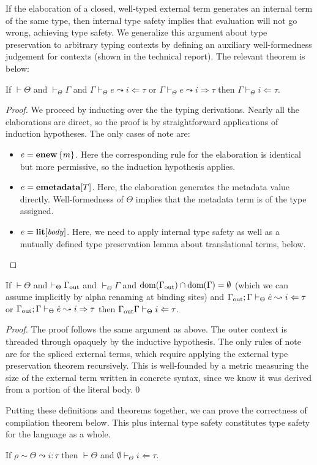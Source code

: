 If the elaboration of a closed, well-typed external term generates an internal term of the same type, then internal type safety implies that evaluation will not go wrong, achieving type safety. We generalize this argument about type preservation to arbitrary typing contexts by defining an auxiliary well-formedness judgement for contexts (shown in the technical report). The relevant theorem is below:

\begin{theorem}
If $\vdash \Theta$ and $\vdash_\Theta \Gamma$ and $\Gamma \vdash_\Theta e \leadsto i \Leftarrow \tau$ or $\Gamma \vdash_\Theta e \leadsto i \Rightarrow \tau$ then $\Gamma \vdash_\Theta i \Leftarrow \tau$.
\end{theorem}
\begin{proof}
We proceed by inducting over the the typing derivations. Nearly all the elaborations are direct, so the proof is by straightforward applications of induction hypotheses. The only cases of note are:
\begin{itemize}
\item $e = \textbf{enew}\,\{m\}$. Here the corresponding rule for the elaboration is identical but more permissive, so the induction hypothesis applies.
\item $e = \textbf{emetadata}[T]$. Here, the elaboration generates the metadata value directly. Well-formedness of $\Theta$ implies that the metadata term is of the type assigned.
\item $e = \textbf{lit}[\mathit{body}]$. Here, we need to apply internal type safety as well as a mutually defined type preservation lemma about translational terms, below.
\end{itemize}
\end{proof}

\begin{lemma}
If $\vdash \Theta$ and $\vdash_\Theta \Gamma_{\text{out}}$ and $\vdash_\Theta \Gamma$ and $\text{dom}(\Gamma_{\text{out}}) \cap \text{dom}(\Gamma) = \emptyset$ (which we can assume implicitly by alpha renaming at binding sites) and $\Gamma_{\text{out}}; \Gamma \vdash_\Theta \hat{e} \leadsto i \Leftarrow \tau$ or $\Gamma_{\text{out}}; \Gamma \vdash_\Theta \hat{e} \leadsto i \Rightarrow \tau$ then $\Gamma_{\text{out}} \Gamma \vdash_\Theta i \Leftarrow \tau$.
\end{lemma}
\begin{proof}
The proof follows the same argument as above. The outer context is threaded through opaquely by the inductive hypothesis. The only rules of note are for the spliced external terms, which require applying the external type preservation theorem recursively. This is well-founded by a metric measuring the size of the external term written in concrete syntax, since we know it was derived from a portion of the literal body.\qed
\end{proof}
\noindent
Putting these definitions and theorems together, we can prove the correctness of compilation theorem below. This plus internal type safety constitutes type safety for the language as a whole.
\begin{theorem}[Compilation]
If $\rho \sim \Theta \leadsto i : \tau$ then $\vdash \Theta$ and $\emptyset \vdash_\Theta i \Leftarrow \tau$.
\end{theorem}
